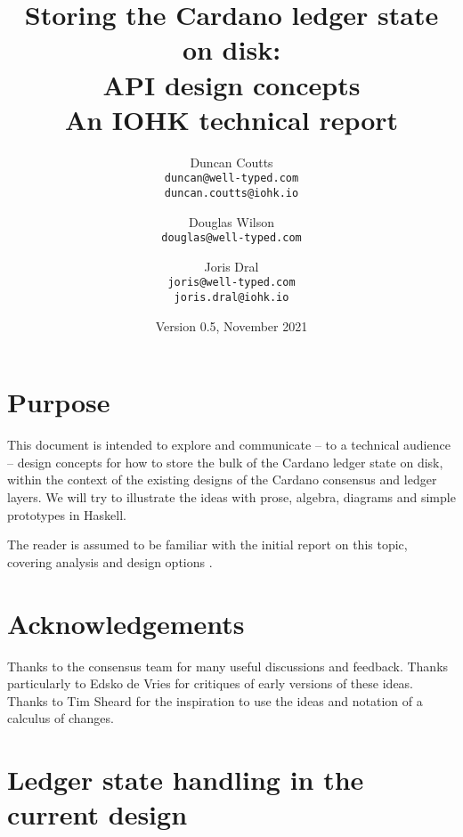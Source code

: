 \documentclass[11pt,a4paper]{article}
\begin{document}
\title{Storing the Cardano ledger state on disk: \\
       API design concepts \\
       {\large \sc An IOHK technical report}
  }
\date{Version 0.5, November 2021}
\author{Duncan Coutts      \\ {\small \texttt{duncan@well-typed.com}} \\
                              {\small \texttt{duncan.coutts@iohk.io}} \\
   \and Douglas Wilson     \\ {\small \texttt{douglas@well-typed.com}} \\
   \and Joris Dral         \\ {\small \texttt{joris@well-typed.com}} \\
                              {\small \texttt{joris.dral@iohk.io}} \\
   }

\maketitle

\section{Purpose}

This document is intended to explore and communicate -- to a technical audience
-- design concepts for how to store the bulk of the Cardano ledger state on
disk, within the context of the existing designs of the Cardano consensus and
ledger layers. We will try to illustrate the ideas with prose, algebra,
diagrams and simple prototypes in Haskell.

The reader is assumed to be familiar with the initial report on this topic,
covering analysis and design options \citep{utxo-db}.

\section{Acknowledgements}

Thanks to the consensus team for many useful discussions and feedback. Thanks
particularly to Edsko de Vries for critiques of early versions of these ideas.
Thanks to Tim Sheard for the inspiration to use the ideas and notation of a
calculus of changes.

\tableofcontents

\section{Ledger state handling in the current design}
\label{ledger-state-handling-in-the-current-design}
\end{document}
